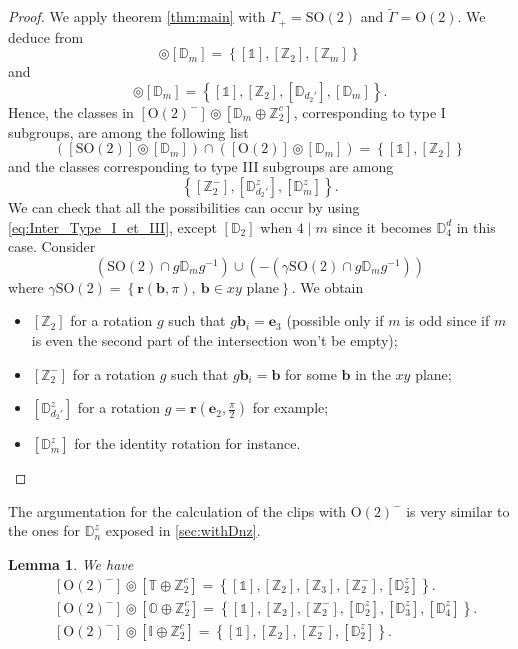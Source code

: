 \documentclass[11pt,a4paper]{amsart}
\newtheorem{lem}[thm]{Lemma}
\theoremstyle{definition}
\newcommand{\ZZ}{\mathbb{Z}}                %
\newcommand{\OO}{\mathrm{O}}                %
\newcommand{\SO}{\mathrm{SO}}               %
\newcommand{\octa}{\mathbb{O}}              %
\newcommand{\ico}{\mathbb{I}}               %
\newcommand{\tetra}{\mathbb{T}}             %
\newcommand{\DD}{\mathbb{D}}                %
\newcommand{\1}{\mathds{1}}		            %
\newcommand{\ee}{\pmb{e}}                   %
\newcommand{\vR}{\mathbf{r}}
\newcommand{\bb}{\mathbf{b}}
\newcommand{\set}[1]{\left\{#1\right\}}     %
\begin{document}
\begin{proof}
		We apply theorem \ref{thm:main} with $\Gamma_+=\SO(2)$ and $\tilde{\Gamma}=\OO(2)$. We deduce from \cite[table 1]{Olive2019}
	\begin{equation*}
		[\SO(2)]\circledcirc [\DD_m]=\set{[\1],[\ZZ_{2}],[\ZZ_{m}]} 
	\end{equation*}
	and
	\begin{equation*}
		[\OO(2)]\circledcirc [\DD_m]=\set{[\1],[\ZZ_2],[\DD_{d_2'}],[\DD_{m}]}.
	\end{equation*}
	Hence, the classes in $[\OO(2)^-]\circledcirc [\DD_m\oplus \ZZ_2^c]$, corresponding to type I subgroups, are among the following list 
	\begin{equation*}
		([\SO(2)]\circledcirc [\DD_m])\cap ([\OO(2)]\circledcirc[\DD_m])=
		\set{[\1],[\ZZ_2]}
	\end{equation*}
	and the classes corresponding to type III subgroups are among
	\begin{equation*}
	\set{[\ZZ_2^-],[\DD_{d_2'}^z],[\DD_m^z]}.
	\end{equation*}
	We can check that all the possibilities can occur by using \eqref{eq:Inter_Type_I_et_III}, except $[\DD_2]$ when $4\mid m$ since it becomes $\DD_4^d$ in this case. Consider
	\begin{equation*}
		(\SO(2)\cap g \DD_m g^{-1})\cup (-(\gamma\SO(2)\cap g \DD_m g^{-1}))
	\end{equation*}
	where $\gamma\SO(2)=\set{\vR(\bb,\pi),\ \bb\in xy \text{ plane}}$.
	We obtain
	\begin{itemize}
		\item $[\ZZ_2]$ for a rotation $g$ such that $g\bb_i=\ee_3$ (possible only if $m$ is odd since if $m$ is even the second part of the intersection won't be empty);
		\item $[\ZZ_2^-]$ for a rotation $g$ such that $g\bb_i=\bb$ for some $\bb$ in the $xy$ plane;
		\item $[\DD_{d_2'}^z]$ for a rotation $g=\vR\left(\ee_2,\frac{\pi}{2}\right)$ for example;
		\item $[\DD_m^z]$ for the identity rotation for instance.
		
	\end{itemize}
\end{proof}
The argumentation for the calculation of the clips with $\OO(2)^-$ is very similar to the ones for $\DD_n^z$ exposed in \autoref{sec:withDnz}.
\begin{lem}
  We have
  \begin{align*}
     & [\OO(2)^-]\circledcirc [\tetra\oplus \ZZ_2^c]=\set{[\1],[\ZZ_2],[\ZZ_3],[\ZZ_2^-],[\DD_2^z]}.                            \\
     & [\OO(2)^-]\circledcirc [\octa\oplus \ZZ_2^c]=\set{[\1],[\ZZ_2],[\ZZ_2^-],[\DD_2^z],[\DD_3^z],[\DD_4^z]}. \\
     & [\OO(2)^-]\circledcirc [\ico\oplus \ZZ_2^c]=\set{[\1],[\ZZ_2],[\ZZ_2^-],[\DD_2^z]}.
  \end{align*}
\end{lem}
\end{document}

